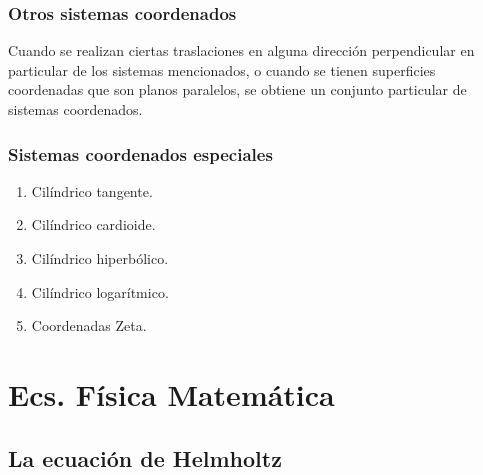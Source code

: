 \documentclass[12pt]{beamer}
\begin{document}
\begin{frame}
\frametitle{Otros sistemas coordenados}
Cuando se realizan ciertas traslaciones en alguna dirección perpendicular en particular de los sistemas mencionados, o cuando se tienen superficies coordenadas que son planos paralelos, \pause se obtiene un conjunto particular de sistemas coordenados.
\end{frame}
\begin{frame}
\frametitle{Sistemas coordenados especiales}
\begin{enumerate}[<+->]
\item Cilíndrico tangente.
\item Cilíndrico cardioide.
\item Cilíndrico hiperbólico.
\item Cilíndrico logarítmico.
\item Coordenadas Zeta.
\end{enumerate}
\end{frame}

\section{Ecs. Física Matemática}
\subsection{La ecuación de Helmholtz}
\end{document}
